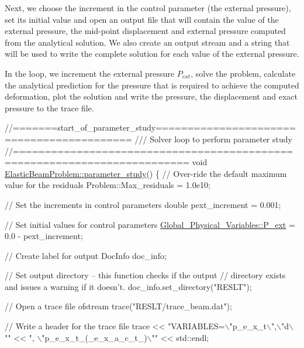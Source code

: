 Next, we choose the increment in the control parameter (the external pressure), set its initial value and open an output file that will contain the value of the external pressure, the mid-\/point displacement and external pressure computed from the analytical solution. We also create an output stream and a string that will be used to write the complete solution for each value of the external pressure.

In the loop, we increment the external pressure $ P_{ext} $, solve the problem, calculate the analytical prediction for the pressure that is required to achieve the computed deformation, plot the solution and write the pressure, the displacement and exact pressure to the trace file.


\begin{DoxyCodeInclude}
\textcolor{comment}{//=======start\_of\_parameter\_study==========================================}
\textcolor{comment}{/// Solver loop to perform parameter study}
\textcolor{comment}{}\textcolor{comment}{//=========================================================================}
\textcolor{keywordtype}{void} \hyperlink{classElasticBeamProblem_a2da3cb02ce953da67fb27742e20774a5}{ElasticBeamProblem::parameter\_study}()
\{
 \textcolor{comment}{// Over-ride the default maximum value for the residuals}
 Problem::Max\_residuals = 1.0e10;
 
 \textcolor{comment}{// Set the increments in control parameters}
 \textcolor{keywordtype}{double} pext\_increment = 0.001;
 
 \textcolor{comment}{// Set initial values for control parameters }
 \hyperlink{namespaceGlobal__Physical__Variables_a0406c0cbd463d1df2458fe5de98a00eb}{Global\_Physical\_Variables::P\_ext} = 0.0 - pext\_increment;
 
 \textcolor{comment}{// Create label for output}
 DocInfo doc\_info;
 
 \textcolor{comment}{// Set output directory -- this function checks if the output}
 \textcolor{comment}{// directory exists and issues a warning if it doesn't.}
 doc\_info.set\_directory(\textcolor{stringliteral}{"RESLT"});
 
 \textcolor{comment}{// Open a trace file}
 ofstream trace(\textcolor{stringliteral}{"RESLT/trace\_beam.dat"});
 
 \textcolor{comment}{// Write a header for the trace file}
 trace << 
  \textcolor{stringliteral}{"VARIABLES=\(\backslash\)"p\_e\_x\_t\(\backslash\)",\(\backslash\)"d\(\backslash\)""} << 
  \textcolor{stringliteral}{", \(\backslash\)"p\_e\_x\_t\_(\_e\_x\_a\_c\_t\_)\(\backslash\)""} << std::endl;
 

\end{DoxyCodeInclude}
